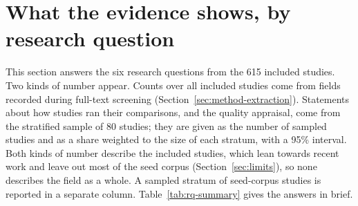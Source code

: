 \section{What the evidence shows, by research question}
\label{sec:rq}

This section answers the six research questions from the 615 included studies. Two kinds of number appear. Counts over all included studies come from fields recorded during full-text screening (Section~\ref{sec:method-extraction}). Statements about how studies ran their comparisons, and the quality appraisal, come from the stratified sample of 80 studies; they are given as the number of sampled studies and as a share weighted to the size of each stratum, with a 95\% interval. Both kinds of number describe the included studies, which lean towards recent work and leave out most of the seed corpus (Section~\ref{sec:limits}), so none describes the field as a whole. A sampled stratum of seed-corpus studies is reported in a separate column. Table~\ref{tab:rq-summary} gives the answers in brief. %

